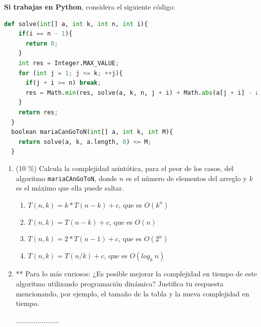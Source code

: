 \documentclass[10 pt]{article}
\begin{document}
\hspace{1cm}

\textbf{Si trabajas en Python}, considera el siguiente código:

    \begin{lstlisting}[language=Python]
  def solve(int[] a, int k, int n, int i){
    if(i == n - 1){
      return 0; 
    }
    int res = Integer.MAX_VALUE;
    for (int j = 1; j <= k; ++j){
      if(j + i >= n) break;
      res = Math.min(res, solve(a, k, n, j + i) + Math.abs(a[j + i] - a[i]));
    }
    return res;
  }
  boolean mariaCanGoToN(int[] a, int k, int M){
    return solve(a, k, a.length, 0) <= M;
  }
  \end{lstlisting}

\begin{enumerate}[label=\alph*]
\item  (10 \%) Calcula la complejidad asintótica, para el peor de los casos, del algoritmo 
  \texttt{mariaCAnGoToN}, donde $n$ es el número de elementos del arreglo y $k$ es el máximo que ella puede saltar.

  \begin{enumerate}[label=(\Alph*)]
  \item $T(n,k) = k*T(n-k) + c$, que es $O(k^n)  $
  \item $T(n,k) = T(n-k) + c$, que es $O(n)$
  \item $T(n,k) = 2*T(n-1) + c$, que es $O(2^n)$
  \item $T(n,k) = T(n/k) + c$, que es $O(log_k\ n)$
  \end{enumerate}

\item ** Para lo más curiosos: ¿Es posible mejorar la complejidad en tiempo de este algoritmo utilizando programación dinámica? Justifica tu respuesta mencionando, por ejemplo, el tamaño de la tabla y la nueva complejidad en tiempo.

......................
\end{enumerate}
\end{document}
